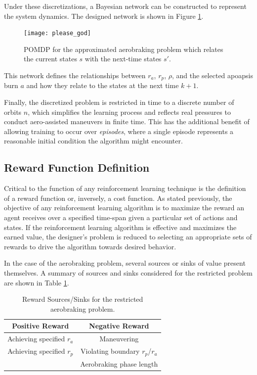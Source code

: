 \documentclass[paper,11pt]{AAS}		%
\begin{document}
Under these discretizations, a Bayesian network can be constructed to represent the system dynamics. The designed network is shown in Figure \ref{fig:designedBN}. 
\begin{figure}[h]
	\centering
	\texttt{[image: please\_god]}
	\caption{POMDP for the approximated aerobraking problem which relates the current states $s$ with the next-time states $s'$.}
	\label{fig:designedBN}
\end{figure}
This network defines the relationships between $r_a$, $r_p$, $\rho$, and the selected apoapsis burn $a$ and how they relate to the states at the next time $k+1$. 

Finally, the discretized problem is restricted in time to a discrete number of orbits $n$, which simplifies the learning process and reflects real pressures to conduct aero-assisted maneuvers in finite time. This has the additional benefit of allowing training to occur over \textit{episodes}, where a single episode represents a reasonable initial condition the algorithm might encounter.

\subsection{Reward Function Definition}
Critical to the function of any reinforcement learning technique is the definition of a reward function or, 
inversely, a cost function. As stated previously, the objective of any reinforcement learning algorithm is to maximize the 
reward an agent receives over a specified time-span given a particular set of actions and states. If the reinforcement learning 
algorithm is effective and maximizes the earned value, the designer's problem is reduced to selecting an appropriate sets of 
rewards to drive the algorithm towards desired behavior.

In the case of the aerobraking problem, several sources or sinks of value present themselves. A summary of sources and sinks considered for the restricted problem are shown in Table \ref{table:aerobrakingRewards}. 

\begin{table}[h]
	\centering
	\caption{\label{table:aerobrakingRewards} Reward Sources/Sinks for the restricted aerobraking problem.}
	\begin{tabular}{c|c}
		Positive Reward & Negative Reward \\
		\hline
		Achieving specified $r_a$ & Maneuvering \\
		Achieving specified $r_p$ & Violating boundary $r_p$/$r_a$ \\
		 & Aerobraking phase length
	\end{tabular}
\end{table}
\end{document}
